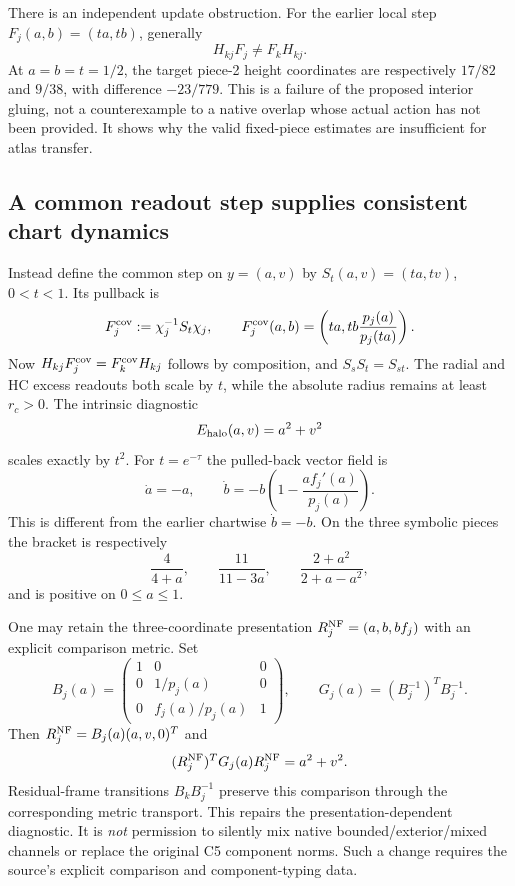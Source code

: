 \documentclass[11pt,a4paper]{article}
\begin{document}
There is an independent update obstruction. For the earlier local
step $F_j(a,b)=(ta,tb)$, generally
\[
 H_{kj}F_j\ne F_kH_{kj}.
\]
At $a=b=t=1/2$, the target piece-2 height coordinates are respectively
$17/82$ and $9/38$, with difference $-23/779$.
This is a failure of the proposed interior gluing, not a counterexample
to a native overlap whose actual action has not been provided. It
shows why the valid fixed-piece estimates are insufficient for atlas
transfer.

\subsection{A common readout step supplies consistent chart dynamics}
Instead define the common step on $y=(a,v)$ by
$S_t(a,v)=(ta,tv)$, $0<t<1$. Its pullback is
\[
 F_j^{\rm cov}:=\chi_j^{-1}S_t\chi_j,
 \qquad
 F_j^{\rm cov}(a,b)
 =\left(ta,tb\frac{p_j(a)}{p_j(ta)}\right).
\]
Now $H_{kj}F_j^{\rm cov}=F_k^{\rm cov}H_{kj}$ follows by composition,
and $S_sS_t=S_{st}$. The radial and HC excess readouts both scale by
$t$, while the absolute radius remains at least $r_c>0$.
The intrinsic diagnostic
\[
 E_{\rm halo}(a,v)=a^2+v^2
\]
scales exactly by $t^2$. For $t=e^{-\tau}$ the pulled-back vector field is
\[
 \dot a=-a,\qquad
 \dot b=-b\left(1-\frac{a f_j'(a)}{p_j(a)}\right).
\]
This is different from the earlier chartwise $\dot b=-b$. On the three
symbolic pieces the bracket is respectively
\[
 \frac4{4+a},\qquad \frac{11}{11-3a},\qquad
 \frac{2+a^2}{2+a-a^2},
\]
and is positive on $0\le a\le1$.

One may retain the three-coordinate presentation
$R_j^{\rm NF}=(a,b,bf_j)$ with an explicit comparison metric. Set
\[
 B_j(a)=\begin{pmatrix}
 1&0&0\\0&1/p_j(a)&0\\0&f_j(a)/p_j(a)&1
 \end{pmatrix},\qquad
 G_j(a)=(B_j^{-1})^TB_j^{-1}.
\]
Then $R_j^{\rm NF}=B_j(a)(a,v,0)^T$ and
\[
 (R_j^{\rm NF})^TG_j(a)R_j^{\rm NF}=a^2+v^2.
\]
Residual-frame transitions $B_kB_j^{-1}$ preserve this comparison
through the corresponding metric transport. This repairs the
presentation-dependent diagnostic. It is \emph{not} permission to
silently mix native bounded/exterior/mixed channels or replace the
original C5 component norms. Such a change requires the source's
explicit comparison and component-typing data.
\end{document}
